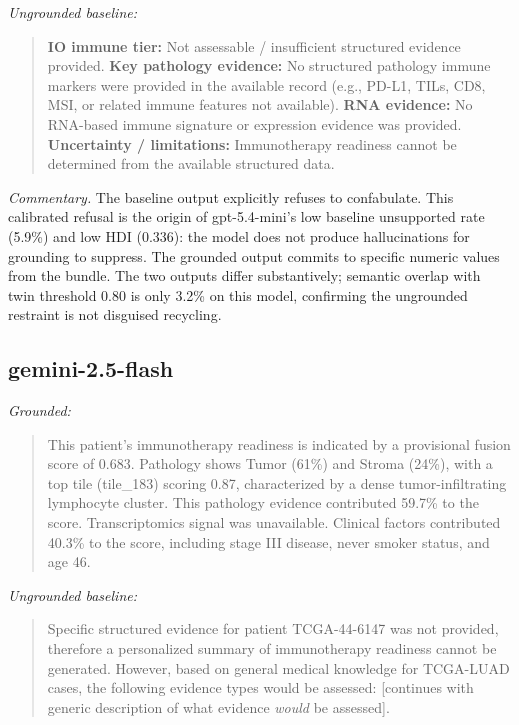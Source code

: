 \documentclass{article}
\theoremstyle{plain}
\begin{document}
\noindent\textit{Ungrounded baseline:}
\begin{quote}\small
\textbf{IO immune tier:} Not assessable / insufficient structured evidence provided.
\textbf{Key pathology evidence:} No structured pathology immune markers were provided in the available record (e.g., PD-L1, TILs, CD8, MSI, or related immune features not available).
\textbf{RNA evidence:} No RNA-based immune signature or expression evidence was provided.
\textbf{Uncertainty / limitations:} Immunotherapy readiness cannot be determined from the available structured data.
\end{quote}

\emph{Commentary.} The baseline output explicitly refuses to confabulate. This calibrated refusal is the origin of gpt-5.4-mini's low baseline unsupported rate (5.9\%) and low HDI (0.336): the model does not produce hallucinations for grounding to suppress. The grounded output commits to specific numeric values from the bundle. The two outputs differ substantively; semantic overlap with twin threshold 0.80 is only 3.2\% on this model, confirming the ungrounded restraint is not disguised recycling.

\subsection{gemini-2.5-flash}

\noindent\textit{Grounded:}
\begin{quote}\small
This patient's immunotherapy readiness is indicated by a provisional fusion score of 0.683. Pathology shows Tumor (61\%) and Stroma (24\%), with a top tile (tile\_183) scoring 0.87, characterized by a dense tumor-infiltrating lymphocyte cluster. This pathology evidence contributed 59.7\% to the score. Transcriptomics signal was unavailable. Clinical factors contributed 40.3\% to the score, including stage III disease, never smoker status, and age 46.
\end{quote}

\noindent\textit{Ungrounded baseline:}
\begin{quote}\small
Specific structured evidence for patient TCGA-44-6147 was not provided, therefore a personalized summary of immunotherapy readiness cannot be generated. However, based on general medical knowledge for TCGA-LUAD cases, the following evidence types would be assessed: [continues with generic description of what evidence \emph{would} be assessed].
\end{quote}
\end{document}
